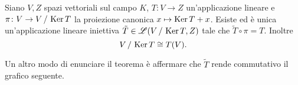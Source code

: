 \begin{teorema} \label{t:isomorfismo-1}
	Siano $V,Z$ spazi vettoriali sul campo $K$, $T\colon V\to Z$ un'applicazione lineare e $\pi\colon V\to V\,/\,\operatorname{Ker} T$ la proiezione canonica $x\mapsto\operatorname{Ker} T+x$.
	Esiste ed è unica un'applicazione lineare iniettiva $\tilde{T}\in\mathscr L(V\,/\,\operatorname{Ker} T,Z)$ tale che $\tilde{T}\circ\pi=T$.
	Inoltre
	\begin{equation}
		V\,/\,\operatorname{Ker} T\cong T(V).
		\label{eq:isomorfismo-1}
	\end{equation}
\end{teorema}
Un altro modo di enunciare il teorema è affermare che $\tilde{T}$ rende commutativo il grafico seguente.
\begin{figure}[h!]
	\centering
\end{figure}
